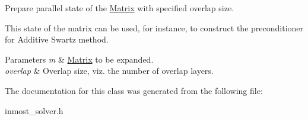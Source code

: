 Prepare parallel state of the \hyperlink{classINMOST_1_1Solver_1_1Matrix}{Matrix} with specified overlap size. 

This state of the matrix can be used, for instance, to construct the preconditioner for Additive Swartz method. 
\begin{DoxyParams}{Parameters}
{\em m} & \hyperlink{classINMOST_1_1Solver_1_1Matrix}{Matrix} to be expanded. \\
\hline
{\em overlap} & Overlap size, viz. the number of overlap layers. \\
\hline
\end{DoxyParams}


The documentation for this class was generated from the following file\-:\begin{DoxyCompactItemize}
\item 
inmost\-\_\-solver.\-h\end{DoxyCompactItemize}
